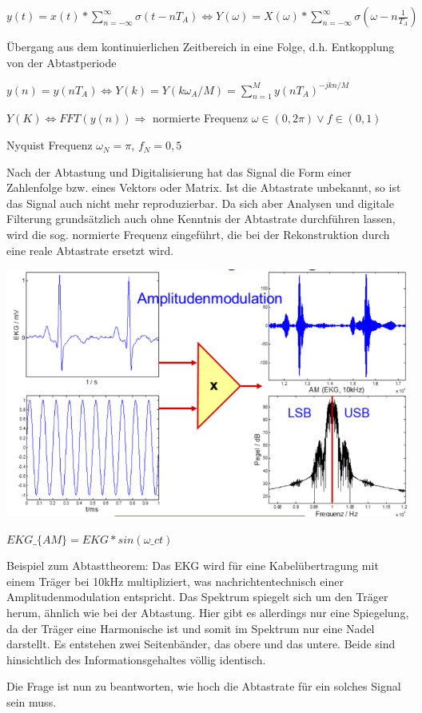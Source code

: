 \documentclass[a4paper]{article}
\begin{document}
\begin{multicols}{3}
  \begin{itemize*}
    \item $y(t)=x(t)*\sum^{\infty}_{n=-\infty} \sigma(t-nT_A) \Leftrightarrow Y(\omega)=X(\omega)*\sum^{\infty}_{n=-\infty}\sigma(\omega-n\frac{1}{T_A})$
    \item Übergang aus dem kontinuierlichen Zeitbereich in eine Folge, d.h. Entkopplung von der Abtastperiode
    \item $y(n)=y(nT_A) \Leftrightarrow Y(k)=Y(k\omega_A/M)=\sum_{n=1}^M y(nT_A)^{-jkn/M}$
    \item $Y(K)\Leftrightarrow FFT(y(n))\Rightarrow$ normierte Frequenz $\omega\in(0,2\pi)\vee f\in(0,1)$
    \item Nyquist Frequenz $\omega_N=\pi$, $f_N=0,5$
    \item Nach der Abtastung und Digitalisierung hat das Signal die Form einer Zahlenfolge bzw. eines Vektors oder Matrix. Ist die Abtastrate unbekannt, so ist das Signal auch nicht mehr reproduzierbar. Da sich aber Analysen und digitale Filterung grundsätzlich auch ohne Kenntnis der Abtastrate durchführen lassen, wird die sog. normierte Frequenz eingeführt, die bei der Rekonstruktion durch eine reale Abtastrate ersetzt wird.
  \end{itemize*}

  \includegraphics[width=.5\linewidth]{Assets/Biosignalverarbeitung-amplitudenmodulation.png}

  \begin{itemize*}
    \item $EKG\_\{AM\}=EKG*sin(\omega\_c t)$
    \item Beispiel zum Abtasttheorem: Das EKG wird für eine Kabelübertragung mit einem Träger bei 10kHz multipliziert, was nachrichtentechnisch einer Amplitudenmodulation entspricht. Das Spektrum spiegelt sich um den Träger herum, ähnlich wie bei der Abtastung. Hier gibt es allerdings nur eine Spiegelung, da der Träger eine Harmonische ist und somit im Spektrum nur eine Nadel darstellt. Es entstehen zwei Seitenbänder, das obere und das untere. Beide sind hinsichtlich des Informationsgehaltes völlig identisch.
    \item Die Frage ist nun zu beantworten, wie hoch die Abtastrate für ein solches Signal sein muss.
  \end{itemize*}


\end{multicols}
\end{document}
